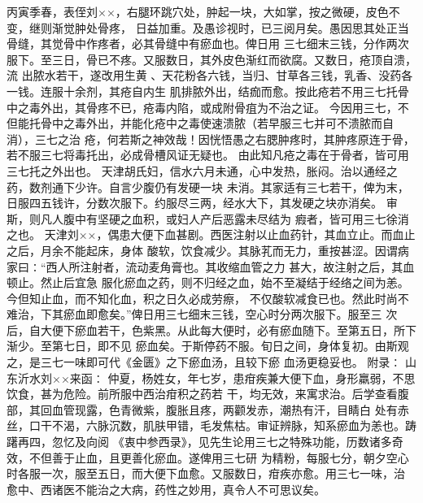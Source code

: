\documentclass[a4paper,12pt,UTF8,twoside]{ctexbook}
\begin{document}
丙寅季春，表侄刘××，右腿环跳穴处，肿起一块，大如掌，按之微硬，皮色不变，继则渐觉肿处骨疼， 
日益加重。及愚诊视时，已三阅月矣。愚因思其处正当骨缝，其觉骨中作疼者，必其骨缝中有瘀血也。俾日用 
三七细末三钱，分作两次服下。至三日，骨已不疼。又服数日，其外皮色渐红而欲腐。又数日，疮顶自溃，流 
出脓水若干，遂改用生黄 、天花粉各六钱，当归、甘草各三钱，乳香、没药各一钱。连服十余剂，其疮自内生 
肌排脓外出，结痂而愈。按此疮若不用三七托骨中之毒外出，其骨疼不已，疮毒内陷，或成附骨疽为不治之证。 
今因用三七，不但能托骨中之毒外出，并能化疮中之毒使速溃脓（若早服三七并可不溃脓而自消），三七之治 
疮，何若斯之神效哉！因恍悟愚之右腮肿疼时，其肿疼原连于骨，若不服三七将毒托出，必成骨槽风证无疑也。 
由此知凡疮之毒在于骨者，皆可用三七托之外出也。 
天津胡氏妇，信水六月未通，心中发热，胀闷。治以通经之药，数剂通下少许。自言少腹仍有发硬一块 
未消。其家适有三七若干，俾为末，日服四五钱许，分数次服下。约服尽三两，经水大下，其发硬之块亦消矣。 
审斯，则凡人腹中有坚硬之血积，或妇人产后恶露未尽结为 瘕者，皆可用三七徐消之也。 
天津刘××，偶患大便下血甚剧。西医注射以止血药针，其血立止。而血止之后，月余不能起床，身体 
酸软，饮食减少。其脉芤而无力，重按甚涩。因谓病家曰∶“西人所注射者，流动麦角膏也。其收缩血管之力 
甚大，故注射之后，其血顿止。然止后宜急 
服化瘀血之药，则不归经之血，始不至凝结于经络之间为恙。今但知止血，而不知化血，积之日久必成劳瘵， 
不仅酸软减食已也。然此时尚不难治，下其瘀血即愈矣。”俾日用三七细末三钱，空心时分两次服下。服至三 
次后，自大便下瘀血若干，色紫黑。从此每大便时，必有瘀血随下。至第五日，所下渐少。至第七日，即不见 
瘀血矣。于斯停药不服。旬日之间，身体复初。由斯观之，是三七一味即可代《金匮》之下瘀血汤，且较下瘀 
血汤更稳妥也。 
附录∶ 
山东沂水刘××来函∶ 
仲夏，杨姓女，年七岁，患疳疾兼大便下血，身形羸弱，不思饮食，甚为危险。前所服中西治疳积之药若 
干，均无效，来寓求治。后学查看腹部，其回血管现露，色青微紫，腹胀且疼，两颧发赤，潮热有汗，目睛白 
处有赤丝，口干不渴，六脉沉数，肌肤甲错，毛发焦枯。审证辨脉，知系瘀血为恙也。踌躇再四，忽忆及向阅 
《衷中参西录》，见先生论用三七之特殊功能，历数诸多奇效，不但善于止血，且更善化瘀血。遂俾用三七研 
为精粉，每服七分，朝夕空心时各服一次，服至五日，而大便下血愈。又服数日，疳疾亦愈。用三七一味，治 
愈中、西诸医不能治之大病，药性之妙用，真令人不可思议矣。 
\end{document}
